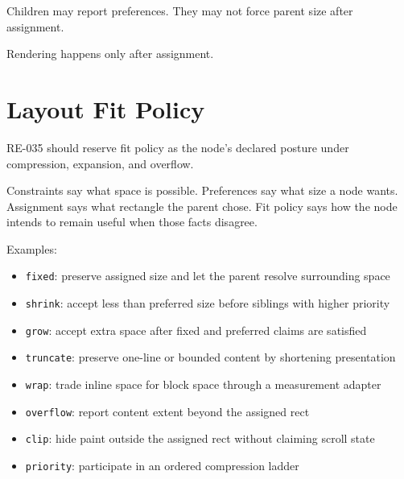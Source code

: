 Children may report preferences. They may not force parent size after assignment.

Rendering happens only after assignment.

\section{Layout Fit Policy}\label{record-163-layout-fit-policy}

RE-035 should reserve fit policy as the node's declared posture under compression, expansion, and overflow.

Constraints say what space is possible. Preferences say what size a node wants. Assignment says what rectangle the parent chose. Fit policy says how the node intends to remain useful when those facts disagree.

Examples:

\begin{itemize}
\tightlist
\item
  \texttt{f\allowbreak{}i\allowbreak{}x\allowbreak{}e\allowbreak{}d}: preserve assigned size and let the parent resolve surrounding space
\item
  \texttt{s\allowbreak{}h\allowbreak{}r\allowbreak{}i\allowbreak{}n\allowbreak{}k}: accept less than preferred size before siblings with higher priority
\item
  \texttt{g\allowbreak{}r\allowbreak{}o\allowbreak{}w}: accept extra space after fixed and preferred claims are satisfied
\item
  \texttt{t\allowbreak{}r\allowbreak{}u\allowbreak{}n\allowbreak{}c\allowbreak{}a\allowbreak{}t\allowbreak{}e}: preserve one-line or bounded content by shortening presentation
\item
  \texttt{w\allowbreak{}r\allowbreak{}a\allowbreak{}p}: trade inline space for block space through a measurement adapter
\item
  \texttt{o\allowbreak{}v\allowbreak{}e\allowbreak{}r\allowbreak{}f\allowbreak{}l\allowbreak{}o\allowbreak{}w}: report content extent beyond the assigned rect
\item
  \texttt{c\allowbreak{}l\allowbreak{}i\allowbreak{}p}: hide paint outside the assigned rect without claiming scroll state
\item
  \texttt{p\allowbreak{}r\allowbreak{}i\allowbreak{}o\allowbreak{}r\allowbreak{}i\allowbreak{}t\allowbreak{}y}: participate in an ordered compression ladder
\end{itemize}

